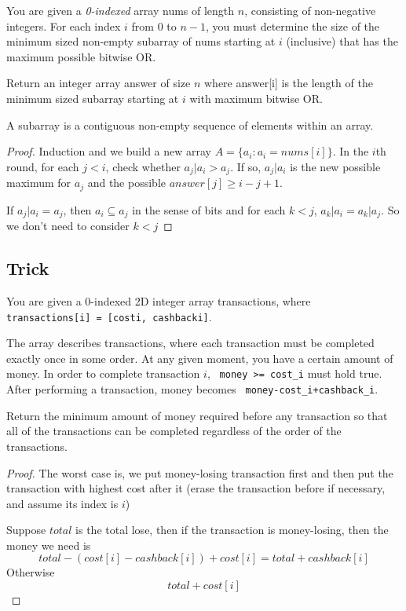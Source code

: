 \documentclass[11pt]{article}
\let\OldTexttt\texttt
\renewcommand{\texttt}[1]{\OldTexttt{\color{MidnightBlue} #1}}
\begin{document}
\begin{problem}
You are given a \emph{0-indexed} array nums of length \(n\), consisting of non-negative integers. For
each index \(i\) from 0 to \(n-1\), you must determine the size of the minimum sized non-empty
subarray of nums starting at \(i\) (inclusive) that has the maximum possible bitwise OR.

Return an integer array answer of size \(n\) where answer[i] is the length of the minimum sized subarray
starting at \(i\) with maximum bitwise OR.

A subarray is a contiguous non-empty sequence of elements within an array.
\end{problem}

\begin{proof}
Induction and we build a new array \(A=\{a_i:a_i=nums[i]\}\). In the \(i\)th round, for
each \(j<i\), check whether \(a_j|a_i>a_j\). If so, \(a_j|a_i\) is the new possible maximum
for \(a_j\) and the possible \(answer[j]\ge i-j+1\).

If \(a_j|a_i=a_j\), then \(a_i\subseteq a_j\) in the sense of bits and for
each \(k<j\), \(a_k|a_i=a_k|a_j\). So we don't need to consider \(k<j\)
\end{proof}
\subsection{Trick}
\label{sec:org48f972d}
\begin{problem}
You are given a 0-indexed 2D integer array transactions, where \texttt{transactions[i] = [costi, cashbacki]}.

The array describes transactions, where each transaction must be completed exactly once in some
order. At any given moment, you have a certain amount of money. In order to complete transaction
\(i\), \texttt{money >= cost\_i} must hold true. After performing a transaction, money becomes \texttt{money-cost\_i+cashback\_i}.

Return the minimum amount of money required before any transaction so that all of the
transactions can be completed regardless of the order of the transactions.
\end{problem}

\begin{proof}
The worst case is, we put money-losing transaction first and then put the transaction with
highest cost after it (erase the transaction before if necessary, and assume its index is \(i\))

Suppose \(total\) is the total lose, then if the transaction is money-losing, then the money we need is
\begin{equation*}
total-(cost[i]-cashback[i])+cost[i] = total+cashback[i]
\end{equation*}
Otherwise
\begin{equation*}
total+cost[i]
\end{equation*}
\end{proof}
\end{document}
